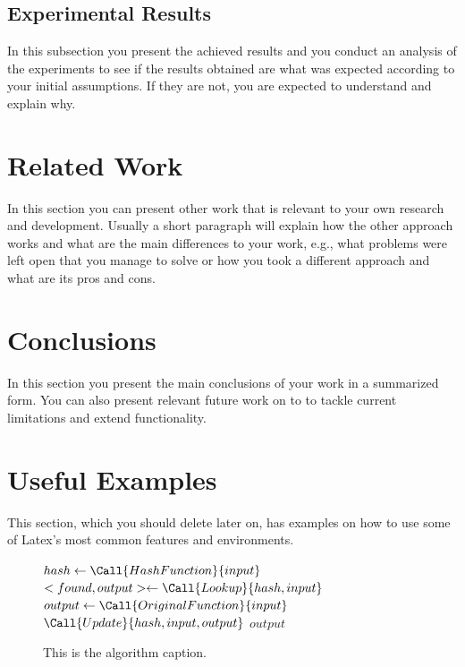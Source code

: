 \documentclass{article}
\begin{document}
\subsection{Experimental Results}
In this subsection you present the achieved results and you conduct an analysis of the experiments to see if the results obtained are what was expected according to your initial assumptions. If they are not, you are expected to understand and explain why.

\section{Related Work}
\label{sec:rel}
In this section you can present other work that is relevant to your own research and development. Usually a short paragraph will explain how the other approach works and what are the main differences to your work, e.g., what problems were left open that you manage to solve or how you took a different approach and what are its pros and cons.

\section{Conclusions}
\label{sec:conclusions}
In this section you present the main conclusions of your work in a summarized form. You can also present relevant future work on to to tackle current limitations and extend functionality.

\section{Useful Examples}
\label{sec:examples}
This section, which you should delete later on, has examples on how to use some of Latex's most common features and environments.

\begin{figure}
    \begin{algorithmic}[1]
        \State $hash \gets \Call{HashFunction}{input}$
        \State $<found,output> \gets \Call{Lookup}{hash, input}$
            \State $output \gets \Call{OriginalFunction}{input}$
            \State $\Call{Update}{hash, input, output}$
        \EndIf
        \State \Return $output$
    \EndFunction
  \end{algorithmic}
  \caption{This is the algorithm caption.}
  \label{alg:memoi}
\end{figure}
\end{document}
